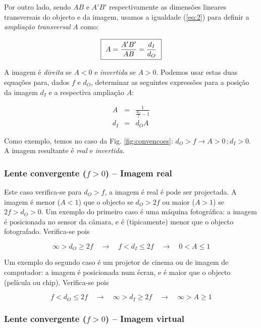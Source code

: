 \documentclass[a4paper,twoside,11pt]{report}      %
\begin{document}
Por outro lado, sendo $AB$ e $A'B'$ respectivamente as dimensões lineares transversais do objecto e da imagem, usamos a igualdade (\ref{eq:2}) para definir a \emph{ampliação transversal} $A$ como:

 \begin{equation}
    \fbox{
        $ \displaystyle
A =  \frac{A'B'}{ AB} =\frac{d_I}{d_O}
$
}
\end{equation}
 
A imagem é \emph{direita} se $A<0$ e \emph{invertida} se $A>0$. Podemos usar estas duas equações para, dados $f$ e $d_O$, determinar as seguintes expressões para a posição da imagem $d_I$ e a respectiva ampliação $A$:
 
\begin{eqnarray}
A&=&\frac{1}{\frac{d_O}{f}-1}\\
d_I&=&d_OA
\end{eqnarray}

 
Como exemplo, temos no caso da Fig. \ref{fig:convencoes}: $d_O>f \to A> 0\,; d_I > 0$. A imagem resultante é \emph{real} e \emph{invertida}.

\subsubsection{\sf Lente convergente ($f>0$) -- Imagem real}
Este caso verifica-se para $d_O>f$, a imagem é real é pode ser projectada. A imagem é menor ($A<1$) que o objecto se $d_O>2f$ ou maior ($A>1$) se $2f>d_O>0$. Um exemplo do primeiro caso é uma máquina fotográfica: a imagem é posicionada no sensor da câmara, e é (tipicamente) menor que o objecto fotografado. Verifica-se   pois

\begin{equation}
\infty > d_O \ge 2 f \quad \to \quad f < d_I \le 2 f  \quad \to \quad 0<A\le 1
\end{equation}

Um exemplo do segundo caso é um projetor de cinema ou de imagem de computador: a imagem é posicionada num écran, e é maior que o objecto (película ou chip). Verifica-se   pois

\begin{equation}
f < d_O \le 2 f  \quad \to  \quad  \infty > d_I \ge 2f \quad \to \quad \infty>A\ge 1
\end{equation}

\subsubsection{\sf Lente convergente ($f>0$) -- Imagem virtual}
\end{document}
